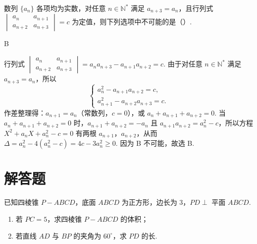 \begin{problem}
数列 \(\{a_n\}\) 各项均为实数，对任意 \(n\in\mathbb N^*\) 满足 \(a_{n+3}=a_n\)，且行列式 \(\begin{vmatrix}a_n&a_{n+1}\\a_{n+2}&a_{n+3}\end{vmatrix}=c\) 为定值，则下列选项中不可能的是（\quad）.

\end{problem}

\begin{answer}
B
\end{answer}

\begin{solution}
行列式 \(\begin{vmatrix}a_n&a_{n+1}\\a_{n+2}&a_{n+3}\end{vmatrix}=a_na_{n+3}-a_{n+1}a_{n+2}=c\). 由于对任意 \(n\in\mathbb N^*\) 满足 \(a_{n+3}=a_n\)，所以
\[
\begin{cases}
a_n^2-a_{n+1}a_{n+2}=c,\\
a_{n+1}^2-a_{n+2}a_{n+3}=c.
\end{cases}
\]
作差整理得：\(a_{n+1}=a_n\)（常数列，\(c=0\)），或 \(a_n+a_{n+1}+a_{n+2}=0\). 当 \(a_n+a_{n+1}+a_{n+2}=0\) 时，\(a_{n+1}+a_{n+2}=-a_n\) 且 \(a_{n+1}a_{n+2}=a_n^2-c\)，所以方程 \(X^2+a_nX+a_n^2-c=0\) 有两根 \(a_{n+1}\)，\(a_{n+2}\)，从而 \(\Delta=a_n^2-4(a_n^2-c)=4c-3a_n^2\geq0\). 因为 B 不可能，故选 B.
\end{solution}

\section{解答题}

\begin{problem}
已知四棱锥 \(P-ABCD\)，底面 \(ABCD\) 为正方形，边长为 \(3\)，\(PD\perp\) 平面 \(ABCD\).
\begin{enumerate}
\item 若 \(PC=5\)，求四棱锥 \(P-ABCD\) 的体积；
\item 若直线 \(AD\) 与 \(BP\) 的夹角为 \(60^\circ\)，求 \(PD\) 的长.
\end{enumerate}

\end{problem}

